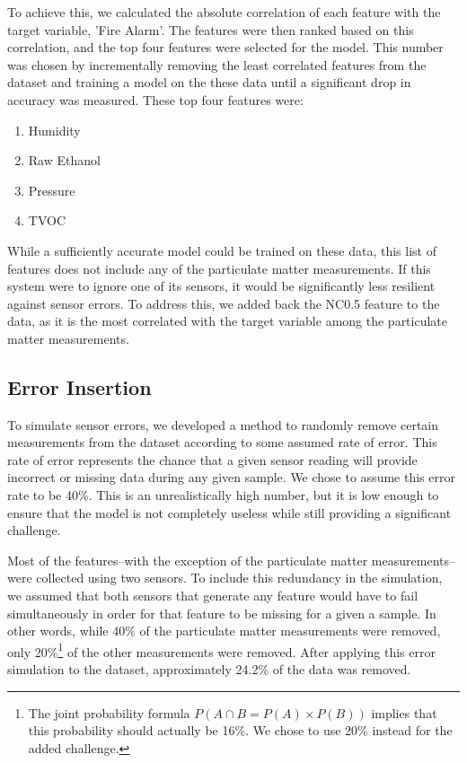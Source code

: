 \documentclass[conference]{IEEEtran}
\begin{document}
To achieve this, we calculated the absolute correlation of
each feature with the target variable, 'Fire Alarm'. The
features were then ranked based on this correlation, and the
top four features were selected for the model. This number
was chosen by incrementally removing the least correlated
features from the dataset and training a model on the these
data until a significant drop in accuracy was measured.
These top four features were:
\begin{enumerate}
    \item Humidity
    \item Raw Ethanol
    \item Pressure
    \item TVOC
\end{enumerate}
While a sufficiently accurate model could be trained on
these data, this list of features does not include any of
the particulate matter measurements. If this system were to
ignore one of its sensors, it would be significantly less
resilient against sensor errors. To address this, we added
back the NC0.5 feature to the data, as it is the most
correlated with the target variable among the particulate
matter measurements.

\subsection{Error Insertion}
To simulate sensor errors, we developed a method to randomly
remove certain measurements from the dataset according to
some assumed rate of error. This rate of error represents
the chance that a given sensor reading will provide
incorrect or missing data during any given sample. We chose
to assume this error rate to be 40\%. This is an
unrealistically high number, but it is low enough to ensure
that the model is not completely useless while still
providing a significant challenge. 

Most of the features--with the exception of the particulate
matter measurements--were collected using two sensors. To
include this redundancy in the simulation, we assumed that
both sensors that generate any feature would have to fail
simultaneously in order for that feature to be missing for a
given a sample. In other words, while 40\% of the
particulate matter measurements were removed, only
20\%\footnote{The joint probability formula $P(A\cap
B=P(A)\times P(B))$ implies that this probability should
actually be 16\%. We chose to use 20\% instead for the added
challenge.} of the other measurements were removed. After
applying this error simulation to the dataset, approximately
24.2\% of the data was removed.
\end{document}
